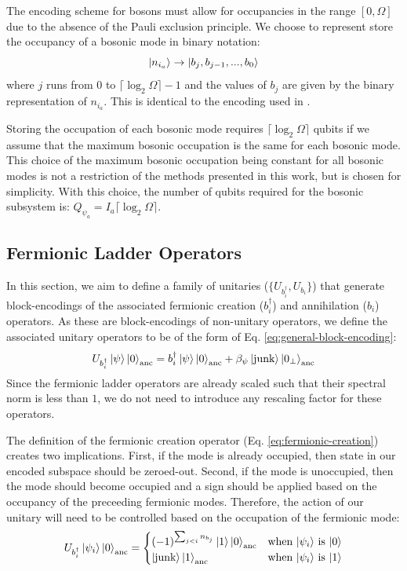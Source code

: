 The encoding scheme for bosons must allow for occupancies in the range $[0, \Omega]$ due to the absence of the Pauli exclusion principle.
We choose to represent store the occupancy of a bosonic mode in binary notation: 
\begin{equation}
    \ket{n_{i_a}} \rightarrow \ket{b_j, b_{j-1}, ..., b_0}
\end{equation}
where $j$ runs from $0$ to $\lceil \log_2{\Omega} \rceil - 1$ and the values of $b_j$ are given by the binary representation of $n_{i_a}$.
This is identical to the encoding used in \cite{rhodes2024exponential}. 

Storing the occupation of each bosonic mode requires $\lceil \log_2{\Omega} \rceil$ qubits if we assume that the maximum bosonic occupation is the same for each bosonic mode.
This choice of the maximum bosonic occupation being constant for all bosonic modes is not a restriction of the methods presented in this work, but is chosen for simplicity. 
With this choice, the number of qubits required for the bosonic subsystem is: $Q_{\psi_a} = I_a \lceil \log_2{\Omega} \rceil$.

\subsection{Fermionic Ladder Operators}
\label{subsec:fermionic-be}

In this section, we aim to define a family of unitaries ($\{U_{b^\dagger_i}, U_{b_i}\}$) that generate block-encodings of the associated fermionic creation ($b_i^\dagger$) and annihilation ($b_i$) operators.
As these are block-encodings of non-unitary operators, we define the associated unitary operators to be of the form of Eq. \ref{eq:general-block-encoding}:
\begin{equation}
    U_{b^\dagger_i} \ket{\psi} \ket{0}_\text{anc} = b^\dagger_i \ket{\psi}\ket{0}_\text{anc} + \beta_\psi \ket{\text{junk}}\ket{0_\perp}_\text{anc}
\end{equation}
Since the fermionic ladder operators are already scaled such that their spectral norm is less than $1$, we do not need to introduce any rescaling factor for these operators.

The definition of the fermionic creation operator (Eq. \ref{eq:fermionic-creation}) creates two implications.
First, if the mode is already occupied, then state in our encoded subspace should be zeroed-out. 
Second, if the mode is unoccupied, then the mode should become occupied and a sign should be applied based on the occupancy of the preceeding fermionic modes.
Therefore, the action of our unitary will need to be controlled based on the occupation of the fermionic mode:
\begin{equation}
    U_{b^\dagger_i} \ket{\psi_i} \ket{0}_\text{anc} =
    \begin{cases} 
        (-1)^{\sum_{j < i} n_{b_j}} \ket{1} \ket{0}_\text{anc} & \text{when $\ket{\psi_i}$ is $\ket{0}$} \\
        \ket{\text{junk}} \ket{1}_\text{anc} & \text{when $\ket{\psi_i}$ is $\ket{1}$} \\
    \end{cases}
\end{equation}

